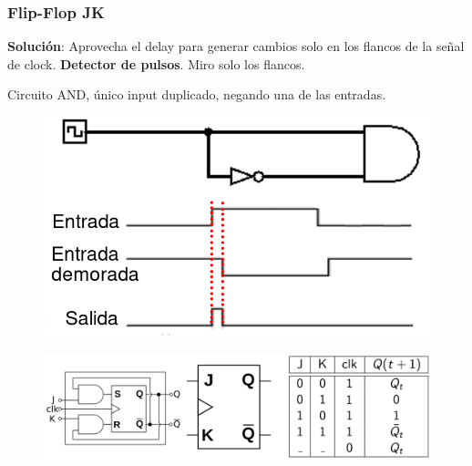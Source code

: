 \documentclass[10pt]{beamer}
\begin{document}
\begin{frame}
\frametitle{Flip-Flop JK}

\textbf{Solución}: Aprovecha el delay para generar cambios solo en los flancos de la se\~nal de clock. \textbf{Detector de pulsos}. Miro solo los flancos.


Circuito AND, único input duplicado,  negando una de las entradas.
\vspace{-0.2cm}
\begin{figure}[h!]
    \centering
    \includegraphics[scale=0.2]{delay.png}
\end{figure}
\pause
\begin{figure}[h!]
    \centering
    \includegraphics[scale=0.2]{flipJK.png}
\end{figure}


\end{frame}
%
%
%
%
%
\end{document}
